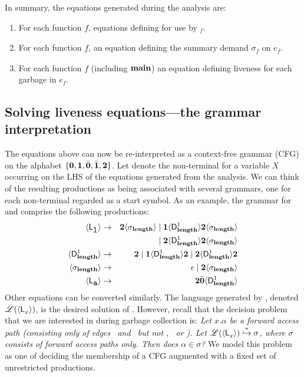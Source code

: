 \documentclass[9pt]{sigplanconf}
\begin{document}
In  summary, the  equations  generated during the
analysis are:
\begin{enumerate}
\item   For  each   function  $\mathit{f}$,   equations
  defining  for use by \Lfonly$_{\mathit f}$.
\item For each function $\mathit{f}$, an equation defining the summary
  demand $\sigma_{\mathit f}$ on $e_f$.
\item   For  each   function  $\mathit{f}$   (including
  $\mathbf{main}$) an  equation  defining
  liveness for each garbage in  $e_{\mathit f}$.
\end{enumerate}

\subsection{Solving liveness equations---the grammar
interpretation}\label{sec:grammar-formulation}      

The  equations  above can  now  be  re-interpreted as  a  context-free
grammar  (CFG) on  the  alphabet $\lbrace\mathbf{0},  \mathbf{1}, \bar{\mathbf{0}},  \bar{\mathbf{1}},
{\mathbf{2}}\rbrace$.  Let  denote  the non-terminal for a variable
$X$ occurring on the LHS of the equations generated from the analysis.
We can  think of  the resulting productions  as being  associated with
several grammars, one for  each non-terminal  regarded
as a start symbol.  As  an example, the grammar for \var{\Lanv{\xl}{}}
and \var{\Lanv{\pa}{}} comprise the following productions:
\begin{eqnarray*}
  \langle \mathsf{L}_{{\mbox{\tt l}}}^{}\rangle  &\rightarrow& 
  {\mathbf{2}}\langle \sigma_{\mathbf{length}}\rangle \mid \mathbf{1} \langle \mathsf{D}_{\mathit {\mathbf{length}}}^{1}\rangle{\ensuremath{{\mathbf{2}}}\ensuremath{\langle \sigma_{\mathbf{length}}\rangle}}  \\ && \mid
  {\mathbf{2}}\langle \mathsf{D}_{\mathit {\mathbf{length}}}^{1}\rangle{\ensuremath{{\mathbf{2}}}\ensuremath{\langle \sigma_{\mathbf{length}}\rangle}} \\
  \langle \mathsf{D}_{\mathit {\mathbf{length}}}^{1}\rangle &\rightarrow& {\mathbf{2}} \mid
  \mathbf{1}\langle \mathsf{D}_{\mathit {\mathbf{length}}}^{1}\rangle{\mathbf{2}}
       \mid {\mathbf{2}}\langle \mathsf{D}_{\mathit {\mathbf{length}}}^{1}\rangle{\ensuremath{{\mathbf{2}}}}\\
\langle {\sigma_{\ensuremath{\mathbf{length}}}} \rangle
&\rightarrow&
\epsilon  \mid {\mathbf{2}}\langle{\sigma_{\ensuremath{\mathbf{length}}}}\rangle \\
\langle \mathsf{L}_{{\mbox{\tt a}}}^{}\rangle &\rightarrow& {\mathbf{2}} \bar{\mathbf{0}} \langle \mathsf{D}_{\mathit {\mathbf{length}}}^{1}\rangle
\end{eqnarray*}
Other  equations  can   be  converted  similarly.   The
language   generated   by  ,   denoted
$\mathscr{L}(\langle \mathsf{L}_{{x}}^{}\rangle)$,   is    the   desired
solution  of  .    
However, recall that the decision problem that we are interested in
during garbage collection is: 
{\em
Let $x.\alpha$ be a forward access path (consisting only
of edges  \acar\ and \acdr\  but not \bcar,  \bcdr\ or
\clazy).       Let      $\mathscr{L}(\langle \mathsf{L}_{{x}}^{}\rangle)
\stackrel{*}{\hookrightarrow}  \sigma$, where  $\sigma$
consists  of  forward  access  paths  only.  Then  does
$\alpha \in \sigma$?
}
We model  this problem as one  of deciding the
membership of  a CFG augmented  with a
fixed set of unrestricted productions.
\end{document}
